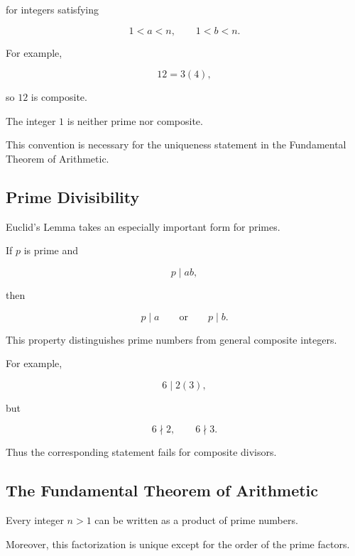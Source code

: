 for integers satisfying

\[ 1<a<n,\qquad 1<b<n. \]

For example,

\[ 12=3(4), \]

so \(12\) is composite.

\begin{warningbox}
The integer \(1\) is neither prime nor composite.

This convention is necessary for the uniqueness statement in the
Fundamental Theorem of Arithmetic.
\end{warningbox}

\subsection{Prime Divisibility}
\label{subsec:prime-divisibility}

Euclid's Lemma takes an especially important form for primes.

\begin{theorem}
If \(p\) is prime and

\[ p\mid ab, \]

then

\[ p\mid a\qquad\text{or}\qquad p\mid b. \]
\end{theorem}

This property distinguishes prime numbers from general composite integers.

For example,

\[ 6\mid2(3), \]

but

\[ 6\nmid2,\qquad6\nmid3. \]

Thus the corresponding statement fails for composite divisors.

\subsection{The Fundamental Theorem of Arithmetic}
\label{subsec:fundamental-theorem-arithmetic}

\begin{theorem}
Every integer \(n>1\) can be written as a product of prime numbers.

Moreover, this factorization is unique except for the order of the prime
factors.
\end{theorem}

